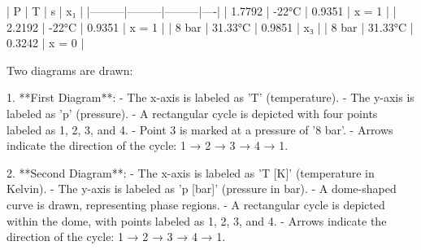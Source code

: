 | P       | T       | s       | x₁ |  
|---------|---------|---------|----|  
| 1.7792  | -22°C   | 0.9351  | x = 1 |  
| 2.2192  | -22°C   | 0.9351  | x = 1 |  
| 8 bar   | 31.33°C | 0.9851  | x₃ |  
| 8 bar   | 31.33°C | 0.3242  | x = 0 |

Two diagrams are drawn:

1. **First Diagram**:  
   - The x-axis is labeled as 'T' (temperature).  
   - The y-axis is labeled as 'p' (pressure).  
   - A rectangular cycle is depicted with four points labeled as 1, 2, 3, and 4.  
   - Point 3 is marked at a pressure of '8 bar'.  
   - Arrows indicate the direction of the cycle: 1 → 2 → 3 → 4 → 1.

2. **Second Diagram**:  
   - The x-axis is labeled as 'T [K]' (temperature in Kelvin).  
   - The y-axis is labeled as 'p [bar]' (pressure in bar).  
   - A dome-shaped curve is drawn, representing phase regions.  
   - A rectangular cycle is depicted within the dome, with points labeled as 1, 2, 3, and 4.  
   - Arrows indicate the direction of the cycle: 1 → 2 → 3 → 4 → 1.